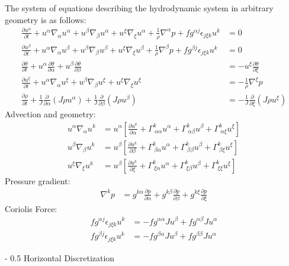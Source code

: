 \documentclass{article}
\makeatletter
\renewcommand\section{\@startsection
  {section}{2}{0mm}%
  {-\baselineskip}%
  {0.5\baselineskip}%
  {\normalfont\Huge\bfseries}}%
\newcommand{\pdiff}[2]{\frac{\partial #1}{\partial #2}}
\makeatother
\begin{document}
The system of equations describing the hydrodynamic system in arbitrary geometry is as follows:
\begin{align}
\pdiff{u^\alpha}{t} + u^\alpha \nabla_\alpha u^\alpha + u^\beta \nabla_\beta u^\alpha + u^\xi \nabla_\xi u^\alpha + \frac{1}{\rho} \nabla^\alpha p + f g^{\alpha j} \epsilon_{j \xi k} u^k &= 0 \\
\pdiff{u^\beta}{t} + u^\alpha \nabla_\alpha u^\beta + u^\beta \nabla_\beta u^\beta + u^\xi \nabla_\xi u^\beta + \frac{1}{\rho} \nabla^\beta p + f g^{\beta j} \epsilon_{j \xi k} u^k &= 0 \\
\pdiff{\theta}{t} + u^\alpha \pdiff{\theta}{\alpha} + u^\beta \pdiff{\theta}{\beta} &= - u^\xi \pdiff{\theta}{\xi} \\
\pdiff{u^\xi}{t} + u^\alpha \nabla_\alpha u^\xi + u^\beta \nabla_\beta u^\xi + u^\xi \nabla_\xi u^\xi &= - \frac{1}{\rho} \nabla^\xi p \\
\pdiff{\rho}{t} + \frac{1}{J} \pdiff{}{\alpha} (J \rho u^\alpha) + \frac{1}{J} \pdiff{}{\beta} (J \rho u^\beta) &= - \frac{1}{J} \pdiff{}{\xi} (J \rho u^\xi)
\end{align}
Advection and geometry:
\begin{align}
u^\alpha \nabla_\alpha u^k &= u^\alpha \left[ \pdiff{u^k}{\alpha} + \Gamma^k_{\ \alpha \alpha} u^\alpha + \Gamma^k_{\ \alpha \beta} u^\beta + \Gamma^k_{\ \alpha \xi} u^\xi \right] \\
u^\beta \nabla_\beta u^k &= u^\beta \left[ \pdiff{u^k}{\beta} + \Gamma^k_{\ \beta \alpha} u^\alpha + \Gamma^k_{\ \beta \beta} u^\beta + \Gamma^k_{\ \beta \xi} u^\xi \right] \\
u^\xi \nabla_\xi u^k &= u^\beta \left[ \pdiff{u^k}{\xi} + \Gamma^k_{\ \xi \alpha} u^\alpha + \Gamma^k_{\ \xi \beta} u^\beta + \Gamma^k_{\ \xi \xi} u^\xi \right]
\end{align}
Pressure gradient:
\begin{align}
\nabla^k p &= g^{k \alpha} \pdiff{p}{\alpha} + g^{k \beta} \pdiff{p}{\beta} + g^{k \xi} \pdiff{p}{\xi}
\end{align}
Coriolis Force:
\begin{align}
f g^{\alpha j} \epsilon_{j \xi k} u^k &= - f g^{\alpha \alpha} J u^\beta + f g^{\alpha \beta} J u^\alpha \\
f g^{\beta j} \epsilon_{j \xi k} u^k &= - f g^{\beta \alpha} J u^\beta + f g^{\beta \beta} J u^\alpha
\end{align}

\section{Horizontal Discretization}
\end{document}
